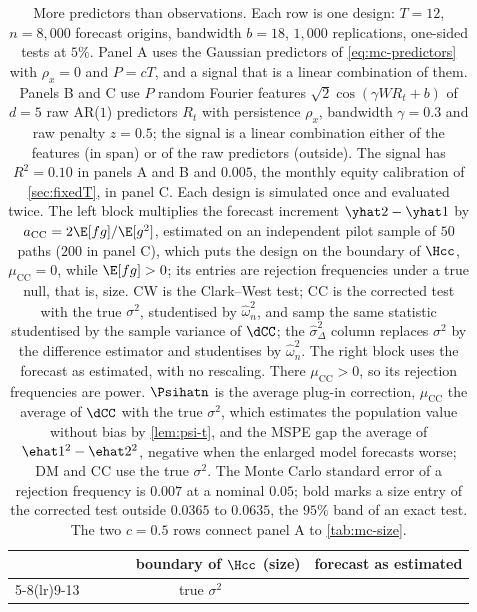 \begin{table}[htbp]
\centering
\caption{More predictors than observations. Each row is one design: $T=12$, $n=8{,}000$ forecast origins, bandwidth $b=18$, $1{,}000$ replications, one-sided tests at $5\%$. Panel A uses the Gaussian predictors of \eqref{eq:mc-predictors} with $\rho_x=0$ and $P=cT$, and a signal that is a linear combination of them. Panels B and C use $P$ random Fourier features $\sqrt2\cos(\gamma WR_t+b)$ of $d=5$ raw AR($1$) predictors $R_t$ with persistence $\rho_x$, bandwidth $\gamma=0.3$ and raw penalty $z=0.5$; the signal is a linear combination either of the features (in span) or of the raw predictors (outside). The signal has $R^2=0.10$ in panels A and B and $0.005$, the monthly equity calibration of \cref{sec:fixedT}, in panel C. Each design is simulated once and evaluated twice. The left block multiplies the forecast increment $\yhat2-\yhat1$ by $a_{\mathrm{CC}}=2\E[fg]/\E[g^2]$, estimated on an independent pilot sample of $50$ paths ($200$ in panel C), which puts the design on the boundary of $\Hcc$, $\mu_{\mathrm{CC}}=0$, while $\E[fg]>0$; its entries are rejection frequencies under a true null, that is, size. CW is the Clark--West test; CC is the corrected test with the true $\sigma^2$, studentised by $\hat\omega^2_n$, and samp the same statistic studentised by the sample variance of $\dCC$; the $\hat\sigma^2_\Delta$ column replaces $\sigma^2$ by the difference estimator and studentises by $\hat\omega^2_n$. The right block uses the forecast as estimated, with no rescaling. There $\mu_{\mathrm{CC}}>0$, so its rejection frequencies are power. $\Psihatn$ is the average plug-in correction, $\mu_{\mathrm{CC}}$ the average of $\dCC$ with the true $\sigma^2$, which estimates the population value without bias by \cref{lem:psi-t}, and the MSPE gap the average of $\ehat1^2-\ehat2^2$, negative when the enlarged model forecasts worse; DM and CC use the true $\sigma^2$. The Monte Carlo standard error of a rejection frequency is $0.007$ at a nominal $0.05$; bold marks a size entry of the corrected test outside $0.0365$ to $0.0635$, the $95\%$ band of an exact test. The two $c=0.5$ rows connect panel A to \cref{tab:mc-size}.}
\label{tab:mc-overparam}
\small
\setlength{\tabcolsep}{4pt}
\begin{tabular}{rrrlrrrrrrrrr}
\toprule
& & & & \multicolumn{4}{c}{boundary of $\Hcc$ (size)} & \multicolumn{5}{c}{forecast as estimated} \\
\cmidrule(lr){5-8}\cmidrule(lr){9-13}
& & & & \multicolumn{3}{c}{true $\sigma^2$} & & & & & & \\

\end{tabular}
\end{table}
